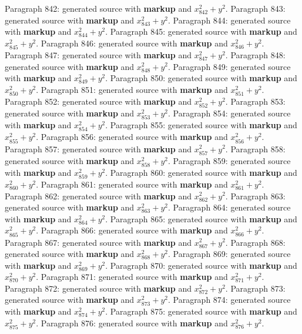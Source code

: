 \documentclass{article}
\begin{document}
Paragraph 842: generated source with \textbf{markup} and $x_{842}^2 + y^2$.
Paragraph 843: generated source with \textbf{markup} and $x_{843}^2 + y^2$.
Paragraph 844: generated source with \textbf{markup} and $x_{844}^2 + y^2$.
Paragraph 845: generated source with \textbf{markup} and $x_{845}^2 + y^2$.
Paragraph 846: generated source with \textbf{markup} and $x_{846}^2 + y^2$.
Paragraph 847: generated source with \textbf{markup} and $x_{847}^2 + y^2$.
Paragraph 848: generated source with \textbf{markup} and $x_{848}^2 + y^2$.
Paragraph 849: generated source with \textbf{markup} and $x_{849}^2 + y^2$.
Paragraph 850: generated source with \textbf{markup} and $x_{850}^2 + y^2$.
Paragraph 851: generated source with \textbf{markup} and $x_{851}^2 + y^2$.
Paragraph 852: generated source with \textbf{markup} and $x_{852}^2 + y^2$.
Paragraph 853: generated source with \textbf{markup} and $x_{853}^2 + y^2$.
Paragraph 854: generated source with \textbf{markup} and $x_{854}^2 + y^2$.
Paragraph 855: generated source with \textbf{markup} and $x_{855}^2 + y^2$.
Paragraph 856: generated source with \textbf{markup} and $x_{856}^2 + y^2$.
Paragraph 857: generated source with \textbf{markup} and $x_{857}^2 + y^2$.
Paragraph 858: generated source with \textbf{markup} and $x_{858}^2 + y^2$.
Paragraph 859: generated source with \textbf{markup} and $x_{859}^2 + y^2$.
Paragraph 860: generated source with \textbf{markup} and $x_{860}^2 + y^2$.
Paragraph 861: generated source with \textbf{markup} and $x_{861}^2 + y^2$.
Paragraph 862: generated source with \textbf{markup} and $x_{862}^2 + y^2$.
Paragraph 863: generated source with \textbf{markup} and $x_{863}^2 + y^2$.
Paragraph 864: generated source with \textbf{markup} and $x_{864}^2 + y^2$.
Paragraph 865: generated source with \textbf{markup} and $x_{865}^2 + y^2$.
Paragraph 866: generated source with \textbf{markup} and $x_{866}^2 + y^2$.
Paragraph 867: generated source with \textbf{markup} and $x_{867}^2 + y^2$.
Paragraph 868: generated source with \textbf{markup} and $x_{868}^2 + y^2$.
Paragraph 869: generated source with \textbf{markup} and $x_{869}^2 + y^2$.
Paragraph 870: generated source with \textbf{markup} and $x_{870}^2 + y^2$.
Paragraph 871: generated source with \textbf{markup} and $x_{871}^2 + y^2$.
Paragraph 872: generated source with \textbf{markup} and $x_{872}^2 + y^2$.
Paragraph 873: generated source with \textbf{markup} and $x_{873}^2 + y^2$.
Paragraph 874: generated source with \textbf{markup} and $x_{874}^2 + y^2$.
Paragraph 875: generated source with \textbf{markup} and $x_{875}^2 + y^2$.
Paragraph 876: generated source with \textbf{markup} and $x_{876}^2 + y^2$.
\end{document}
